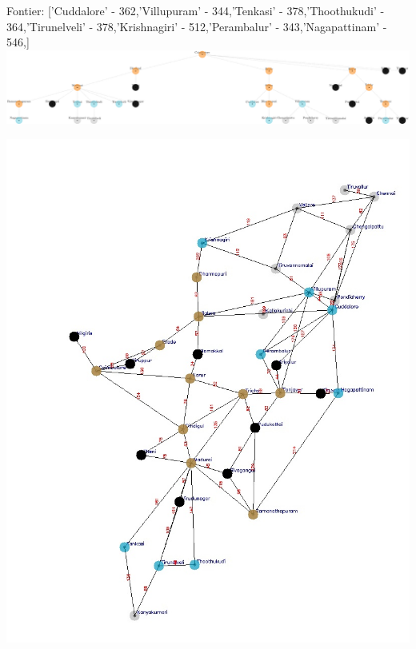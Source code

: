 \documentclass[xcolor=table]{beamer}
\begin{document}
\begin{frame}
  { \tiny Fontier: ['Cuddalore' - 362,'Villupuram' - 344,'Tenkasi' - 378,'Thoothukudi' - 364,'Tirunelveli' - 378,'Krishnagiri' - 512,'Perambalur' - 343,'Nagapattinam' - 546,]}
  \includegraphics[width=1\textwidth]{../UCSNodes/30-1.png}
  \begin{center}
    \includegraphics[height=0.55\textheight]{../UCSoutput/tamilUCS28.jpg}
  \end{center}
\end{frame}
\end{document}
